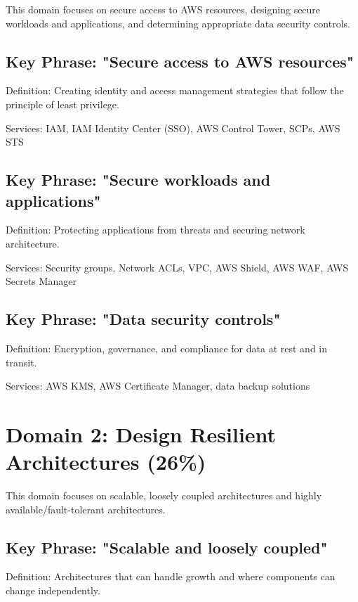 \documentclass[11pt,a4paper]{report}
\begin{document}
This domain focuses on secure access to AWS resources, designing secure workloads and applications, and determining appropriate data security controls.



\section{Key Phrase: "Secure access to AWS resources"}

Definition: Creating identity and access management strategies that follow the principle of least privilege.

Services: IAM, IAM Identity Center (SSO), AWS Control Tower, SCPs, AWS STS



\section{Key Phrase: "Secure workloads and applications"}

Definition: Protecting applications from threats and securing network architecture.

Services: Security groups, Network ACLs, VPC, AWS Shield, AWS WAF, AWS Secrets Manager



\section{Key Phrase: "Data security controls"}

Definition: Encryption, governance, and compliance for data at rest and in transit.

Services: AWS KMS, AWS Certificate Manager, data backup solutions



\chapter{Domain 2: Design Resilient Architectures (26\%)}

This domain focuses on scalable, loosely coupled architectures and highly available/fault-tolerant architectures.



\section{Key Phrase: "Scalable and loosely coupled"}

Definition: Architectures that can handle growth and where components can change independently.
\end{document}
